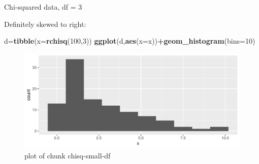 \documentclass[ignorenonframetext,]{beamer}
\newenvironment{Shaded}{\begin{snugshade}}{\end{snugshade}}
\newcommand{\DataTypeTok}[1]{\textcolor[rgb]{0.13,0.29,0.53}{#1}}
\newcommand{\DecValTok}[1]{\textcolor[rgb]{0.00,0.00,0.81}{#1}}
\newcommand{\KeywordTok}[1]{\textcolor[rgb]{0.13,0.29,0.53}{\textbf{#1}}}
\newcommand{\NormalTok}[1]{#1}
\newcommand{\OperatorTok}[1]{\textcolor[rgb]{0.81,0.36,0.00}{\textbf{#1}}}
\begin{document}
\begin{frame}[fragile]{Chi-squared data, df = 3}
\protect\hypertarget{chi-squared-data-df-3}{}

Definitely skewed to right:

\begin{Shaded}
\begin{Highlighting}[]
\NormalTok{d=}\KeywordTok{tibble}\NormalTok{(}\DataTypeTok{x=}\KeywordTok{rchisq}\NormalTok{(}\DecValTok{100}\NormalTok{,}\DecValTok{3}\NormalTok{))}
\KeywordTok{ggplot}\NormalTok{(d,}\KeywordTok{aes}\NormalTok{(}\DataTypeTok{x=}\NormalTok{x))}\OperatorTok{+}\KeywordTok{geom_histogram}\NormalTok{(}\DataTypeTok{bins=}\DecValTok{10}\NormalTok{)}
\end{Highlighting}
\end{Shaded}

\begin{figure}
\centering
\includegraphics{figure/chisq-small-df-1.pdf}
\caption{plot of chunk chisq-small-df}
\end{figure}

\end{frame}
\end{document}

